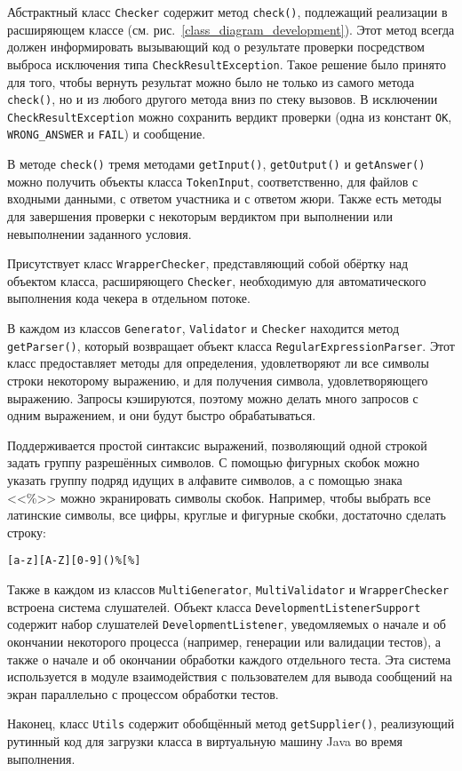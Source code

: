 Абстрактный класс \texttt{Checker} содержит метод \texttt{check()}, подлежащий реализации в расширяющем классе (см. рис.~\ref{class_diagram_development}). Этот метод всегда должен информировать вызывающий код о результате проверки посредством выброса исключения типа \texttt{Check\-Result\-Exception}. Такое решение было принято для того, чтобы вернуть результат можно было не только из самого метода \texttt{check()}, но и из любого другого метода вниз по стеку вызовов. В исключении \texttt{Check\-Result\-Exception} можно сохранить вердикт проверки (одна из констант \texttt{OK}, \texttt{WRONG\_ANSWER} и \texttt{FAIL}) и сообщение.

В методе \texttt{check()} тремя методами \texttt{getInput()}, \texttt{getOutput()} и \texttt{getAnswer()} можно получить объекты класса \texttt{Token\-Input}, соответственно, для файлов с входными данными, с ответом участника и с ответом жюри. Также есть методы для завершения проверки с некоторым вердиктом при выполнении или невыполнении заданного условия.

Присутствует класс \texttt{Wrapper\-Checker}, представляющий собой обёртку над объектом класса, расширяющего \texttt{Checker}, необходимую для автоматического выполнения кода чекера в отдельном потоке.

В каждом из классов \texttt{Generator}, \texttt{Validator} и \texttt{Checker} находится метод \texttt{getParser()}, который возвращает объект класса \texttt{RegularExpressionParser}. Этот класс предоставляет методы для определения, удовлетворяют ли все символы строки некоторому выражению, и для получения символа, удовлетворяющего выражению. Запросы кэшируются, поэтому можно делать много запросов с одним выражением, и они будут быстро обрабатываться.

Поддерживается простой синтаксис выражений, позволяющий одной строкой задать группу разрешённых символов. С помощью фигурных скобок можно указать группу подряд идущих в алфавите символов, а с помощью знака <<\%>> можно экранировать символы скобок. Например, чтобы выбрать все латинские символы, все цифры, круглые и фигурные скобки, достаточно сделать строку:

\begin{center}
\texttt{[a-z][A-Z][0-9]()\%[\%]}
\end{center}

Также в каждом из классов \texttt{Multi\-Generator}, \texttt{Multi\-Validator} и \texttt{Wrapper\-Checker} встроена система слушателей. Объект класса \texttt{Development\-Listener\-Sup\-port} содержит набор слушателей \texttt{Development\-Listener}, уведомляемых о начале и об окончании некоторого процесса (например, генерации или валидации тестов), а также о начале и об окончании обработки каждого отдельного теста. Эта система используется в модуле взаимодействия с пользователем для вывода сообщений на экран параллельно с процессом обработки тестов.

Наконец, класс \texttt{Utils} содержит обобщённый метод \texttt{getSupplier()}, реализующий рутинный код для загрузки класса в виртуальную машину Java во время выполнения.